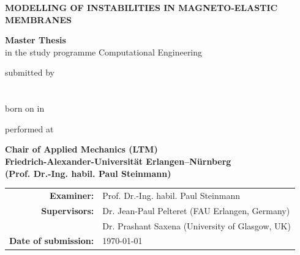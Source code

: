 \documentclass[a4paper,12pt,BCOR0mm,headsepline,final,oneside]{scrbook}
\newcommand{\thethesis}[0]{%
  Master Thesis
}
\newcommand{\field}[1]{%
  {\itshape \{#1\}}
}
\begin{document}
\frontmatter
\begin{titlepage}

  \begin{center}
    
    {\LARGE \bf
      \textbf{MODELLING OF INSTABILITIES IN MAGNETO-ELASTIC MEMBRANES}\\
    } 
    
    \vspace*{1.5cm}
    {\Large{\textbf{\thethesis} \\in the study programme Computational Engineering}}
    \vspace{1.5cm}
    
    {\large submitted by} \\
    \vspace*{0.5cm}
    {\Large \bf {}} \\
    \vspace*{0.2cm}
    {\large \bf {}} \\
    \vspace*{0.2cm}
    {\large born on  in } 
    
    \vspace{1.5cm}
    
    {\large performed at}

    \vspace{0.5cm}
    
    {\bf 
      Chair of Applied Mechanics (LTM)\\
      Friedrich-Alexander-Universit\"at Erlangen--N\"urnberg \\
      (Prof. Dr.-Ing. habil. Paul Steinmann)
      }
    
    \vspace{1cm}
    \begin{tabular}{rl}
    \textbf{Examiner:}& Prof. Dr.-Ing. habil. Paul Steinmann \vspace{0.5cm} \\    
    \textbf{Supervisors:}& Dr. Jean-Paul Pelteret (FAU Erlangen, Germany)\\
    		 & Dr. Prashant Saxena (University of Glasgow, UK) \vspace{0.5cm} \\    
    \textbf{Date of submission:}& \today
    \end{tabular}
    

\end{center}
\end{titlepage}
\end{document}

